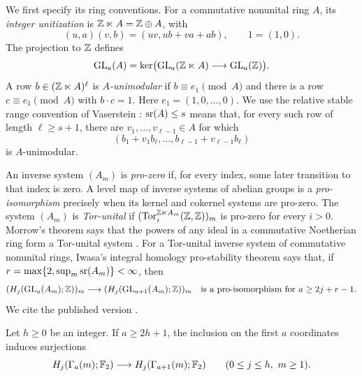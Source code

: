 We first specify its ring conventions. For a commutative nonunital ring
$A$, its \emph{integer unitization} is $\mathbb Z\ltimes A=\mathbb Z\oplus A$, with
\[
 (u,a)(v,b)=(uv,ub+va+ab),\qquad 1=(1,0).
\]
The projection to $\mathbb Z$ defines
\[
 \operatorname{GL}_a(A)=\ker\bigl(\operatorname{GL}_a(\mathbb Z\ltimes A)\longrightarrow\operatorname{GL}_a(\mathbb Z)\bigr).
\]
A row $b\in(\mathbb Z\ltimes A)^\ell$ is \emph{$A$-unimodular} if
$b\equiv e_1\pmod A$ and there is a row $c\equiv e_1\pmod A$ with
$b\cdot c=1$. Here $e_1=(1,0,\ldots,0)$. We use the relative stable
range convention of Vaserstein \cite[Section~2, pp.~384--385]{Vas1969}:
$\operatorname{sr}(A)\le s$ means that, for every such row of length $\ell\ge s+1$,
there are $v_1,\ldots,v_{\ell-1}\in A$ for which
\[
 (b_1+v_1b_\ell,\ldots,b_{\ell-1}+v_{\ell-1}b_\ell)
\]
is $A$-unimodular.

An inverse system $(A_m)$ is \emph{pro-zero} if, for every index, some later
transition to that index is zero. A level map of inverse systems of
abelian groups is a \emph{pro-isomorphism} precisely when its kernel
and cokernel systems are pro-zero. The system $(A_m)$ is \emph{Tor-unital}
if $(\operatorname{Tor}_i^{\mathbb Z\ltimes A_m}(\mathbb Z,\mathbb Z))_m$ is pro-zero for every $i>0$.
Morrow's theorem says that the powers of any ideal in a commutative
Noetherian ring form a Tor-unital system
\cite[Theorem~0.3, arXiv~v2]{Morrow}.
For a Tor-unital inverse system of commutative nonunital rings,
Iwasa's integral homology pro-stability theorem says that, if
$r=\max\{2,\sup_m\operatorname{sr}(A_m)\}<\infty$, then
\begin{equation}\label{eq:iwasa}
 (H_j(\operatorname{GL}_a(A_m);\mathbb Z))_m\longrightarrow
 (H_j(\operatorname{GL}_{a+1}(A_m);\mathbb Z))_m
 \quad\text{is a pro-isomorphism for }a\ge2j+r-1.
\end{equation}
We cite the published version \cite[Theorem~5.13]{Iwasa}.

\begin{lemma}\label{lem:stabilization}
Let $h\ge0$ be an integer. If $a\ge2h+1$, the inclusion on the first
$a$ coordinates induces
surjections
\[
 H_j(\Gamma_a(m);\mathbb F_2)\longrightarrow H_j(\Gamma_{a+1}(m);\mathbb F_2)
 \qquad(0\le j\le h,\ m\ge1).
\]
\end{lemma}

